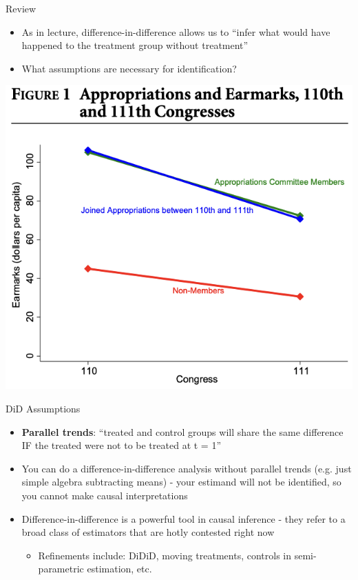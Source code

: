 \documentclass[]{beamer}
\begin{document}
\begin{frame}{Review}
	\begin{itemize}
		\item As in lecture, difference-in-difference allows us to ``infer what would have happened to the treatment group without treatment''
		\item What assumptions are necessary for identification? 
	\end{itemize}
	\centering
	\includegraphics[scale=.5]{slideinputs/berryfowler.png}
\end{frame}

\begin{frame}{DiD Assumptions}

	\begin{itemize}
		\item \textbf{Parallel trends}: ``treated and control groups will share the same difference IF the treated were not to be treated at t = 1''
		\item You can do a difference-in-difference analysis without parallel trends (e.g. just simple algebra subtracting means) - your estimand will not be identified, so you cannot make causal interpretations 
		\item Difference-in-difference is a powerful tool in causal inference - they refer to a broad class of estimators that are hotly contested right now 
		\begin{itemize}
			\item Refinements include: DiDiD, moving treatments, controls in semi-parametric estimation, etc.
		\end{itemize}
	\end{itemize}
	
\end{frame}
\end{document}

